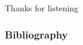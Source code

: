 \documentclass[12pt]{beamer}
\begin{document}
\begin{frame}
	\centering	
\huge{ Thanks for listening\\}
\end{frame}


\begin{frame}[allowframebreaks]
	\frametitle{Bibliography}
	

{\footnotesize}
\end{frame}
\end{document}
